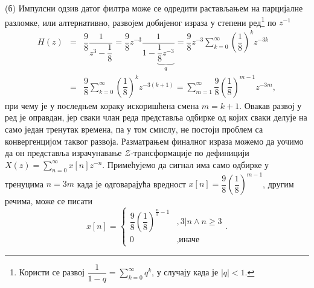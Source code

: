 (б) Импулсни одзив датог филтра може се одредити растављањем на парцијалне разломке, или алтернативно, 
развојем добијеног израза у степени ред\footnote{ Користи се развој
$\dfrac{1}{1 - q} = \sum_{k = 0}^\infty q^k$, у случају када је $|q| < 1$. } по $z^{-1}$ 
\begin{eqnarray}
    H(z) &=& \dfrac{9}{8} \dfrac{1}{z^3 - \dfrac{1}{8}} =
           \dfrac{9}{8} z^{-3} \dfrac{1}{1 - \underbrace{\dfrac{1}{8}z^{-3}}_q }
         = \dfrac{9}{8} z^{-3} \sum_{k = 0}^{\infty} \left(\dfrac{1}{8}\right)^k z^{-3k} \\
         &=& \dfrac{9}{8} \sum_{k = 0}^{\infty} \left(\dfrac{1}{8}\right)^k z^{-3(k+1)} 
        =  \sum_{m = 1}^{\infty} \dfrac{9}{8}\left(\dfrac{1}{8}\right)^{m-1} z^{-3m},
\end{eqnarray}
при чему је у последњем кораку искоришћена смена $m = k + 1$. 
Овакав развој у ред је оправдан, јер сваки члан реда представља одбирке од којих сваки делује на само један тренутак времена, 
па у том смислу, не постоји проблем са конвергенцијом таквог развоја. Разматрањем финалног израза можемо да уочимо да 
он представља израчунавање $\mathcal{Z}$-трансформације по дефиницији 
$X(z) = \sum_{n = 0}^{\infty} x[n] z^{-n}$. Примећујемо да сигнал има само одбирке у тренуцима $n = 3m$ када је 
одговарајућа вредност $x[n] = \dfrac{9}{8}\left(\dfrac{1}{8}\right)^{m-1}$, другим речима, може се писати 
\begin{equation}
    x[n] = \begin{cases}
        \dfrac{9}{8}\left(\dfrac{1}{8}\right)^{\frac{n}{3}-1} &, 3|n \land n \geq 3 \\
        0 &, \text{иначе}
    \end{cases}.
\end{equation}
